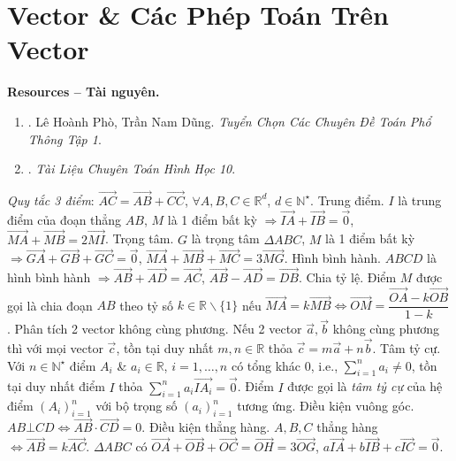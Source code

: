 \documentclass{article}
\begin{document}
\section{Vector \& Các Phép Toán Trên Vector}
\textbf{\textsf{Resources -- Tài nguyên.}}
\begin{enumerate}
	\item \cite[Chuyên đề 1: {\it Vector Phẳng}]{Pho_Dung_chuyen_de_Toan_PT_1}. {\sc Lê Hoành Phò, Trần Nam Dũng}. {\it Tuyển Chọn Các Chuyên Đề Toán Phổ Thông Tập 1}.
	\item \cite{TLCT_hinh_hoc_10}. {\it Tài Liệu Chuyên Toán Hình Học 10}.
\end{enumerate}
 {\it Quy tắc 3 điểm}: $\overrightarrow{AC} = \overrightarrow{AB} + \overrightarrow{CC}$, $\forall A,B,C\in\mathbb{R}^d$, $d\in\mathbb{N}^\star$.  {\sf Trung điểm.} $I$ là trung điểm của đoạn thẳng $AB$, $M$ là 1 điểm bất kỳ $\Rightarrow\overrightarrow{IA} + \overrightarrow{IB} = \vec{0}$, $\overrightarrow{MA} + \overrightarrow{MB} = 2\overrightarrow{MI}$.  {\sf Trọng tâm.} $G$ là trọng tâm $\Delta ABC$, $M$ là 1 điểm bất kỳ $\Rightarrow\overrightarrow{GA} + \overrightarrow{GB} + \overrightarrow{GC} = \vec{0}$, $\overrightarrow{MA} + \overrightarrow{MB} + \overrightarrow{MC} = 3\overrightarrow{MG}$.  {\sf Hình bình hành.} $ABCD$ là hình bình hành $\Rightarrow\overrightarrow{AB} + \overrightarrow{AD} = \overrightarrow{AC}$, $\overrightarrow{AB} - \overrightarrow{AD} = \overrightarrow{DB}$.  {\sf Chia tỷ lệ.} Điểm $M$ được gọi là chia đoạn $AB$ theo tỷ số $k\in\mathbb{R}\backslash\{1\}$ nếu $\overrightarrow{MA} = k\overrightarrow{MB}\Leftrightarrow\overrightarrow{OM} = \dfrac{\overrightarrow{OA} - k\overrightarrow{OB}}{1 - k}$.  {\sf Phân tích 2 vector không cùng phương.} Nếu 2 vector $\vec{a},\vec{b}$ không cùng phương thì với mọi vector $\vec{c}$, tồn tại duy nhất $m,n\in\mathbb{R}$ thỏa $\vec{c} = m\vec{a} + n\vec{b}$.  {\sf Tâm tỷ cự.} Với $n\in\mathbb{N}^\star$ điểm $A_i$ \& $a_i\in\mathbb{R}$, $i = 1,\ldots,n$ có tổng khác 0, i.e., $\sum_{i=1}^n a_i\ne0$, tồn tại duy nhất điểm $I$ thỏa $\sum_{i=1}^n a_i\overrightarrow{IA_i} = \vec{0}$. Điểm $I$ được gọi là {\it tâm tỷ cự} của hệ điểm $(A_i)_{i=1}^n$ với bộ trọng số $(a_i)_{i=1}^n$ tương ứng.  {\sf Điều kiện vuông góc.} $AB\bot CD\Leftrightarrow\overrightarrow{AB}\cdot\overrightarrow{CD} = 0$.  {\sf Điều kiện thẳng hàng.} $A,B,C$ thẳng hàng $\Leftrightarrow\overrightarrow{AB} = k\overrightarrow{AC}$.  $\Delta ABC$ có $\overrightarrow{OA} + \overrightarrow{OB} + \overrightarrow{OC} = \overrightarrow{OH} = 3\overrightarrow{OG}$, $a\overrightarrow{IA} + b\overrightarrow{IB} + c\overrightarrow{IC} = \vec{0}$.
\end{document}
